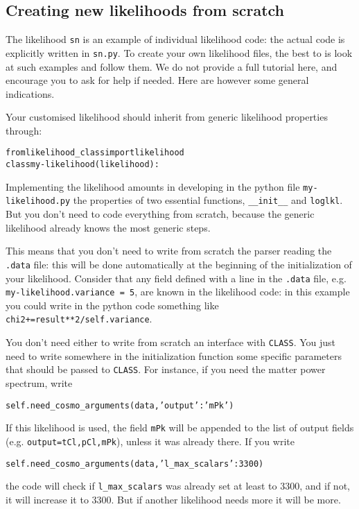 \documentclass[10pt]{article}
\newcommand{\CLASS}{\texttt{CLASS}}
\begin{document}
\subsection{Creating new likelihoods from scratch}

The likelihood \verb?sn? is an example of individual likelihood code: the actual code is explicitly written in \verb?sn.py?. To create your own likelihood files, the best to is look at such examples and follow them. We do not provide a full tutorial here, and encourage you to ask for help if needed. Here are however some general indications.

Your customised likelihood should inherit from generic likelihood properties through:
 \begin{alltt}
  from likelihood_class import likelihood
  class my-likelihood(likelihood):
  \end{alltt}

Implementing the likelihood amounts in developing in the python file \verb?my-likelihood.py? the properties of two essential functions, \verb?__init__? and \verb?loglkl?. But you don't need to code everything from scratch, because the generic likelihood already knows the most generic steps.

This means that you don't need to write from scratch the parser reading the \verb?.data? file: this will be done automatically at the beginning of the initialization of your likelihood. Consider that any field defined with a line in the \verb?.data? file, e.g. \verb?my-likelihood.variance = 5?, are known in the likelihood code: in this example you could write in the python code something like \verb?chi2+=result**2/self.variance?.

You don't need either to write from scratch an interface with \CLASS. You just need to write somewhere in the initialization function  some specific parameters that should be passed to \CLASS. For instance, if you need the matter power spectrum, write
\begin{alltt}
self.need_cosmo_arguments(data,{'output':'mPk'})
  \end{alltt}
  If this likelihood is used, the field \verb?mPk? will be appended to the list of output fields (e.g. \verb?output=tCl,pCl,mPk?), unless it was already there. If you write
\begin{alltt}
self.need_cosmo_arguments(data,{'l_max_scalars':3300})
   \end{alltt}
   the code will check if \verb?l_max_scalars? was already set at least to 3300, and if not, it will increase it to 3300. But if another likelihood needs more it will be more.
   
\end{document}
